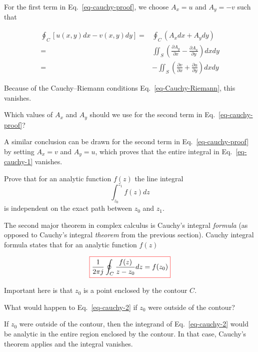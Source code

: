 For the first term in Eq.~\ref{eq-cauchy-proof}, we choose $A_x=u$ and $A_y=-v$ such that

\begin{align}
\oint_{C}\left[u(x,y)dx-v(x,y)dy\right] =& \oint_{{C}} \left(A_x dx + A_y dy\right) \nonumber \\
=& \iint_S \left(\frac{\partial A_y}{\partial x} - \frac{\partial A_x}{\partial y} \right)dx dy \nonumber \\ =& -\iint_S \left(\frac{\partial v}{\partial x} + \frac{\partial u}{\partial y} \right)dx dy 
\end{align} 

Because of the Cauchy--Riemann conditions Eq.~\ref{eq-Cauchy-Riemann}, this
vanishes.

\begin{cue}
Which values of $A_x$ and $A_y$ should we use for the second term in Eq.~\ref{eq-cauchy-proof}?
\end{cue}

A similar conclusion can be drawn for the second term in Eq.~\ref{eq-cauchy-proof} by setting $A_x=v$ and $A_y=u$, which proves that the entire integral in Eq.~\ref{eq-cauchy-1} vanishes.

\begin{exer}
Prove that for an analytic function $f(z)$ the line integral 
$$\int_{z_0}^{z_1}f(z)dz$$
is independent on the exact path between $z_0$ and $z_1$.
\end{exer}



The second major theorem in complex calculus is Cauchy's integral \emph{formula} (as opposed to Cauchy's integral \emph{theorem} from the previous section). Cauchy integral formula states that for an analytic function $f(z)$

\begin{equation}
\fbox{$\displaystyle
\frac{1}{2 \pi j}\oint_{{C}} \frac{f(z)} {z-z_0} dz = f(z_0)
\label{eq-cauchy-2}
$}
\end{equation}

Important here is that $z_0$ is a point enclosed by the contour ${C}$.

\begin{cue}
What would happen to Eq.~\ref{eq-cauchy-2} if  $z_0$ were outside of the contour?  
\end{cue}

If $z_0$ were outside of the contour, then the integrand of Eq.~\ref{eq-cauchy-2} would be analytic in the entire region enclosed by the contour. In that case, Cauchy's theorem applies and the integral vanishes.

